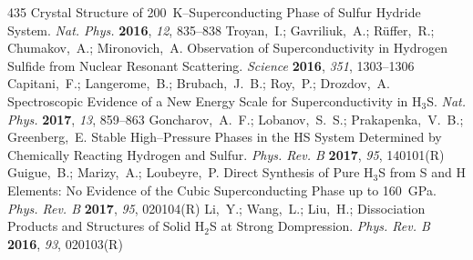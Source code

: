 \documentclass[12pt,letterpaper,oneside]{article}
\begin{document}
\begin{mcitethebibliography}{435}
    Crystal Structure of 200~K--Superconducting Phase of Sulfur
  Hydride System. \emph{Nat. Phys.} \textbf{2016}, \emph{12}, 835--838\relax
\mciteBstWouldAddEndPuncttrue
\mciteSetBstMidEndSepPunct{\mcitedefaultmidpunct}
{\mcitedefaultendpunct}{\mcitedefaultseppunct}\relax
\EndOfBibitem
{}
Troyan,~I.; Gavriliuk,~A.; R{\"u}ffer,~R.; Chumakov,~A.; Mironovich,~A.
    Observation of Superconductivity in Hydrogen Sulfide from
  Nuclear Resonant Scattering. \emph{Science} \textbf{2016}, \emph{351},
  1303--1306\relax
\mciteBstWouldAddEndPuncttrue
\mciteSetBstMidEndSepPunct{\mcitedefaultmidpunct}
{\mcitedefaultendpunct}{\mcitedefaultseppunct}\relax
\EndOfBibitem
{}
Capitani,~F.; Langerome,~B.; Brubach,~J.~B.; Roy,~P.; Drozdov,~A.
    Spectroscopic Evidence of a New Energy Scale for
  Superconductivity in H$_3$S. \emph{Nat. Phys.} \textbf{2017}, \emph{13},
  859--863\relax
\mciteBstWouldAddEndPuncttrue
\mciteSetBstMidEndSepPunct{\mcitedefaultmidpunct}
{\mcitedefaultendpunct}{\mcitedefaultseppunct}\relax
\EndOfBibitem
{}
Goncharov,~A.~F.; Lobanov,~S.~S.; Prakapenka,~V.~B.; Greenberg,~E. Stable
  High--Pressure Phases in the HS System Determined by Chemically Reacting
  Hydrogen and Sulfur. \emph{Phys. Rev. B} \textbf{2017}, \emph{95},
  140101(R)\relax
\mciteBstWouldAddEndPuncttrue
\mciteSetBstMidEndSepPunct{\mcitedefaultmidpunct}
{\mcitedefaultendpunct}{\mcitedefaultseppunct}\relax
\EndOfBibitem
{}
Guigue,~B.; Marizy,~A.; Loubeyre,~P. Direct Synthesis of Pure H$_3$S from S and
  H Elements: No Evidence of the Cubic Superconducting Phase up to 160~GPa.
  \emph{Phys. Rev. B} \textbf{2017}, \emph{95}, 020104(R)\relax
\mciteBstWouldAddEndPuncttrue
\mciteSetBstMidEndSepPunct{\mcitedefaultmidpunct}
{\mcitedefaultendpunct}{\mcitedefaultseppunct}\relax
\EndOfBibitem
{}
Li,~Y.; Wang,~L.; Liu,~H.;   Dissociation
  Products and Structures of Solid H$_2$S at Strong Dompression. \emph{Phys.
  Rev. B} \textbf{2016}, \emph{93}, 020103(R)\relax

\end{mcitethebibliography}
\end{document}
